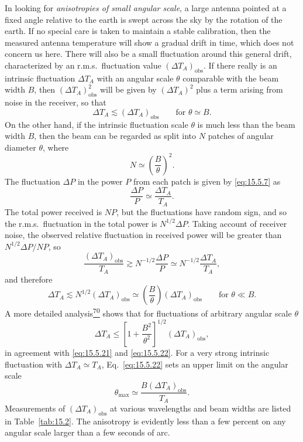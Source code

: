 In looking for \emph{anisotropies of small angular scale}, a large antenna
pointed at a fixed angle relative to the earth is swept across the sky by the
rotation of the earth. If no special care is taken to maintain a stable
calibration, then the measured antenna temperature will show a gradual drift in
time, which does not concern us here. There will also be a small fluctuation
around this general drift, characterized by an r.m.s.\ fluctuation value
\((\Delta T_A)_{\mathrm{obs}}\). If there really is an intrinsic fluctuation
\(\Delta T_A\) with an angular scale \(\theta\) comparable with the beam width
\(B\), then \((\Delta T_A)^2_{\mathrm{obs}}\) will be given by
\((\Delta T_A)^2\) plus a term arising from noise in the receiver, so that
\begin{equation}
  \Delta T_A\lesssim(\Delta T_A)_{\mathrm{obs}}
  \qquad\text{for }\theta\simeq B.
  \tag{15.5.21}\label{eq:15.5.21}
\end{equation}
On the other hand, if the intrinsic fluctuation scale \(\theta\) is much less
than the beam width \(B\), then the beam can be regarded as split into \(N\)
patches of angular diameter \(\theta\), where
\[
  N\simeq\left(\frac{B}{\theta}\right)^2.
\]
The fluctuation \(\Delta P\) in the power \(P\) from each patch is given by
\eqref{eq:15.5.7} as
\[
  \frac{\Delta P}{P}\simeq\frac{\Delta T_A}{T_A}.
\]
The total power received is \(NP\), but the fluctuations have random sign,
and so the r.m.s.\ fluctuation in the total power is \(N^{1/2}\Delta P\).
Taking account of receiver noise, the observed relative fluctuation in
received power will be greater than \(N^{1/2}\Delta P/NP\), so
\[
  \frac{(\Delta T_A)_{\mathrm{obs}}}{T_A}
  \gtrsim
  N^{-1/2}\frac{\Delta P}{P}
  \simeq
  N^{-1/2}\frac{\Delta T_A}{T_A},
\]
and therefore
\begin{equation}
  \Delta T_A
  \lesssim
  N^{1/2}(\Delta T_A)_{\mathrm{obs}}
  \simeq
  \left(\frac{B}{\theta}\right)(\Delta T_A)_{\mathrm{obs}}
  \qquad\text{for }\theta\ll B.
  \tag{15.5.22}\label{eq:15.5.22}
\end{equation}
A more detailed analysis\hyperref[ch15-ref-70]{\textsuperscript{70}} shows
that for fluctuations of arbitrary angular scale \(\theta\)
\[
  \Delta T_A
  \leq
  \left[1+\frac{B^2}{\theta^2}\right]^{1/2}
  (\Delta T_A)_{\mathrm{obs}},
\]
in agreement with \eqref{eq:15.5.21} and \eqref{eq:15.5.22}. For a very
strong intrinsic fluctuation with \(\Delta T_A\simeq T_A\),
Eq.~\eqref{eq:15.5.22} sets an upper limit on the angular scale
\begin{equation}
  \theta_{\max}
  \simeq
  \frac{B(\Delta T_A)_{\mathrm{obs}}}{T_A}.
  \tag{15.5.23}\label{eq:15.5.23}
\end{equation}
Measurements of \((\Delta T_A)_{\mathrm{obs}}\) at various wavelengths and
beam widths are listed in Table~\ref{tab:15.2}. The anisotropy is evidently
less than a few percent on any angular scale larger than a few seconds of arc.

